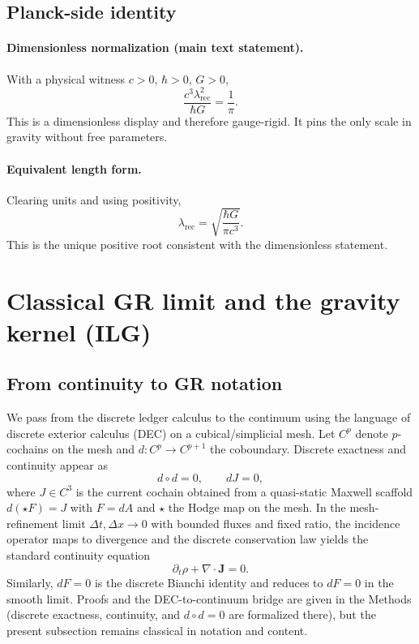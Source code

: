 \documentclass[11pt]{article}
\begin{document}
\subsection{Planck-side identity}\label{subsec:planck-id}

\paragraph{Dimensionless normalization (main text statement).}
With a physical witness $c>0$, $\hbar>0$, $G>0$,
\[
\boxed{\frac{c^3\lambda_{\mathrm{rec}}^{2}}{\hbar G} = \frac{1}{\pi}}.
\]
This is a dimensionless display and therefore gauge-rigid. It pins the only scale in gravity without free parameters.

\paragraph{Equivalent length form.}
Clearing units and using positivity,
\[
\boxed{\lambda_{\mathrm{rec}} = \sqrt{\frac{\hbar G}{\pi c^3}}}.
\]
This is the unique positive root consistent with the dimensionless statement. %


\section{Classical GR limit and the gravity kernel (ILG)}\label{sec:ilg}

\subsection{From continuity to GR notation}
We pass from the discrete ledger calculus to the continuum using the language of discrete exterior calculus (DEC) on a cubical/simplicial mesh. Let $C^p$ denote $p$-cochains on the mesh and $d:C^p\to C^{p+1}$ the coboundary. Discrete exactness and continuity appear as
\begin{equation}
d\circ d=0, \qquad dJ=0,
\end{equation}
where $J\in C^3$ is the current cochain obtained from a quasi-static Maxwell scaffold $d(\star F)=J$ with $F=dA$ and $\star$ the Hodge map on the mesh. In the mesh-refinement limit $\Delta t,\Delta x\to 0$ with bounded fluxes and fixed ratio, the incidence operator maps to divergence and the discrete conservation law yields the standard continuity equation
\begin{equation}
\partial_t\rho+\nabla\!\cdot\! \mathbf{J}=0.
\end{equation}
Similarly, $dF=0$ is the discrete Bianchi identity and reduces to $dF=0$ in the smooth limit. Proofs and the DEC-to-continuum bridge are given in the Methods (discrete exactness, continuity, and $d\circ d=0$ are formalized there), but the present subsection remains classical in notation and content.
\end{document}
